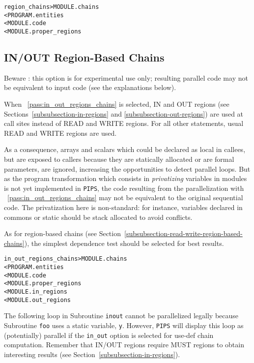 \documentclass[a4paper]{report}
\newenvironment{PipsMake}{\begin{alltt}}{\end{alltt}}
\newcommand{\PipsPassRef}[1]{\texttt{\detokenize{#1}}~\ref{pass:#1}}
\newenvironment{PipsPass}[1]{\label{pass:#1}}{}
\newcommand{\Pips}{\texttt{PIPS}}
\begin{document}
\begin{PipsMake}
region_chains                   > MODULE.chains
        < PROGRAM.entities
        < MODULE.code
        < MODULE.proper_regions
\end{PipsMake}

\subsection{IN/OUT Region-Based Chains}

\begin{PipsPass}{in_out_regions_chains}
\label{subsubsection-in-out-region-based-chains}

Beware : this option is for experimental use only; resulting parallel code
may not be equivalent to input code (see the explanations below).

When \PipsPassRef{in_out_regions_chains} is selected, IN and OUT regions (see
Sections~\ref{subsubsection-in-regions} and
\ref{subsubsection-out-regions}) are used at call sites instead of
READ and WRITE regions. For all other statements, usual READ and WRITE
regions are used.

As a consequence, arrays and scalars which could be declared as local
in callees, but are exposed to callers because they are statically
allocated or are formal parameters, are ignored, increasing the
opportunities to detect parallel loops. But as the program
transformation which consists in {\em privatizing} variables in
modules is not yet implemented in \Pips{}, the code resulting from the
parallelization with \PipsPassRef{in_out_regions_chains} may not be
equivalent to the original sequential code. The privatization here is
non-standard: for instance, variables declared in commons or static
should be stack allocated to avoid conflicts.

As for region-based chains (see
Section~\ref{subsubsection-read-write-region-based-chains}), the
simplest dependence test should be selected for best results.
\end{PipsPass}

\begin{PipsMake}
in_out_regions_chains           > MODULE.chains
        < PROGRAM.entities
        < MODULE.code
        < MODULE.proper_regions
        < MODULE.in_regions
        < MODULE.out_regions
\end{PipsMake}

The following loop in Subroutine \verb+inout+ cannot be parallelized legally
because Subroutine \verb+foo+ uses a static variable, \verb+y+. However,
\Pips{} will display this loop as (potentially) parallel if the
\verb+in_out+ option is selected for use-def chain computation. Remember
that IN/OUT regions require MUST regions to obtain interesting results
(see Section~\ref{subsubsection-in-regions}).
\end{document}
